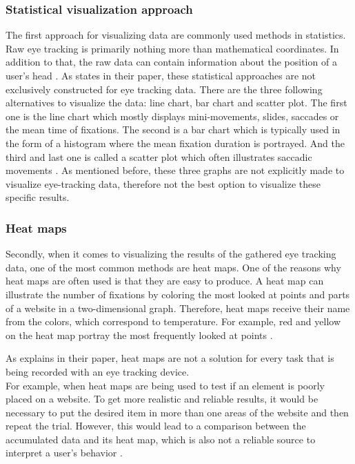 \subsubsection{Statistical visualization approach}
The first approach for visualizing data are commonly used methods in statistics. Raw eye tracking is primarily nothing more than mathematical coordinates. In addition to that, the raw data can contain information about the position of a user's head \autocite[]{bruneau2002eyes, biedert2010eyebook, kurzhals2016gaze}. 
As \textcite[]{blascheck2014state} states in their paper, these statistical approaches are not exclusively constructed for eye tracking data. There are the three following alternatives to visualize the data: line chart, bar chart and scatter plot. The first one is the line chart which mostly displays mini-movements, slides, saccades or the mean time of fixations. The second is a bar chart which is typically used in the form of a histogram where the mean fixation duration is portrayed. And the third and last one is called a scatter plot which often illustrates saccadic movements \autocite[]{blascheck2014state}.
As mentioned before, these three graphs are not explicitly made to visualize eye-tracking data, therefore not the best option to visualize these specific results.

\subsubsection{Heat maps}
Secondly, when it comes to visualizing the results of the gathered eye tracking data, one of the most common methods are heat maps. One of the reasons why heat maps are often used is that they are easy to produce. 
A heat map can illustrate the number of fixations by coloring the most looked at points and parts of a website in a two-dimensional graph. Therefore, heat maps receive their name from the colors, which correspond to temperature. For example, red and yellow on the heat map portray the most frequently looked at points \autocite[]{bojko2009informative}. 

As \textcite[]{bojko2009informative} explains in their paper, heat maps are not a solution for every task that is being recorded with an eye tracking device. \\
For example, when heat maps are being used to test if an element is poorly placed on a website. To get more realistic and reliable results, it would be necessary to put the desired item in more than one areas of the website and then repeat the trial. However, this would lead to a comparison between the accumulated data and its heat map, which is also not a reliable source to interpret a user's behavior \autocite[]{bojko2009informative}. 

